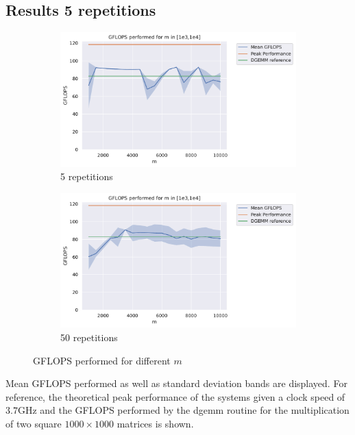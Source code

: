 \documentclass{scrartcl}
\begin{document}
	\subsection{Results 5 repetitions}
	\begin{figure}[h]
		\centering
		\begin{subfigure}[b]{0.49\textwidth}
			\centering
			\includegraphics[width=\textwidth]{../plots/q3}
			\caption{5 repetitions}
			\label{fig:q3-5}
		\end{subfigure}
		\hfill
		\begin{subfigure}[b]{0.49\textwidth}
			\centering
			\includegraphics[width=\textwidth]{../plots/q3-50}
			\caption{50 repetitions}
			\label{fig:q3-50}
		\end{subfigure}
		\caption{GFLOPS performed for different $m$}
		\label{fig:q3}
	\end{figure}
	Mean GFLOPS performed as well as standard deviation bands are displayed. 
	For reference, the theoretical peak performance of the systems given a clock speed of $3.7$GHz and the GFLOPS performed by the dgemm routine for the multiplication of two square $1000 \times 1000$ matrices is shown.
	
\end{document}
